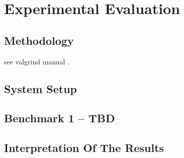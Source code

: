 \chapter{Experimental Evaluation}

\section{Methodology}

see valgrind manual \cite{valgrind}.

\section{System Setup}

\section{Benchmark 1 -- TBD}

\section{Interpretation Of The Results}
